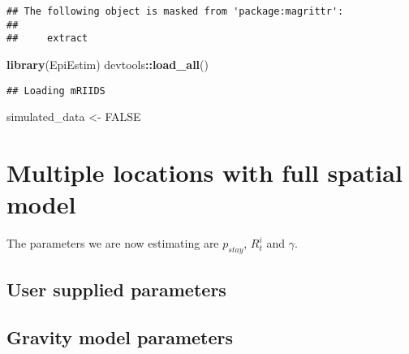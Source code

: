 \documentclass[11pt,]{article}
\newenvironment{Shaded}{\begin{snugshade}}{\end{snugshade}}
\newcommand{\KeywordTok}[1]{\textcolor[rgb]{0.13,0.29,0.53}{\textbf{#1}}}
\newcommand{\StringTok}[1]{\textcolor[rgb]{0.31,0.60,0.02}{#1}}
\newcommand{\OtherTok}[1]{\textcolor[rgb]{0.56,0.35,0.01}{#1}}
\newcommand{\OperatorTok}[1]{\textcolor[rgb]{0.81,0.36,0.00}{\textbf{#1}}}
\newcommand{\NormalTok}[1]{#1}
\begin{document}
\begin{verbatim}
## The following object is masked from 'package:magrittr':
## 
##     extract
\end{verbatim}

\begin{Shaded}
\begin{Highlighting}[]
\KeywordTok{library}\NormalTok{(EpiEstim)}
\NormalTok{devtools}\OperatorTok{::}\KeywordTok{load_all}\NormalTok{()}
\end{Highlighting}
\end{Shaded}

\begin{verbatim}
## Loading mRIIDS
\end{verbatim}

\begin{Shaded}
\begin{Highlighting}[]
\NormalTok{simulated_data <-}\StringTok{ }\OtherTok{FALSE}
\end{Highlighting}
\end{Shaded}

\section{Multiple locations with full spatial
model}\label{multiple-locations-with-full-spatial-model}

The parameters we are now estimating are \(p_{stay}\), \(R_t^i\) and
\(\gamma\).

\subsection{User supplied parameters}\label{user-supplied-parameters}

\begin{Shaded}
\end{Shaded}

\subsection{Gravity model parameters}\label{gravity-model-parameters}
\end{document}
